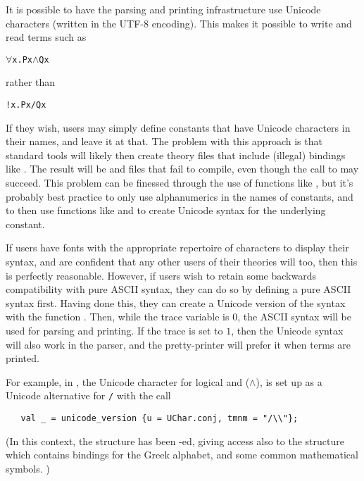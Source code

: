 It is possible to have the \HOL{} parsing and printing infrastructure
use Unicode characters (written in the UTF-8 encoding).  This makes it
possible to write and read terms such as
\begin{alltt}
   \(\forall\)x. P x \(\land\) Q x
\end{alltt}
rather than
\begin{alltt}
   !x. P x /\bs{} Q x
\end{alltt}
If they wish, users may simply define constants that have Unicode
characters in their names, and leave it at that.  The problem with
this approach is that standard tools will likely then create theory
files that include (illegal) \ML{} bindings like .  The result will be  and
 files that fail to compile, even though the call to
 may succeed. This problem can be finessed through
the use of functions like , but it's probably best
practice to only use alphanumerics in the names of constants, and to
then use functions like  and  to create
Unicode syntax for the underlying constant.

If users have fonts with the appropriate repertoire of characters to
display their syntax, and are confident that any other users of their
theories will too, then this is perfectly reasonable.  However, if
users wish to retain some backwards compatibility with pure ASCII
syntax, they can do so by defining a pure ASCII syntax first.  Having
done this, they can create a Unicode version of the syntax with the
function .  Then, while the trace
variable  is $0$, the ASCII syntax will be used for
parsing and printing.  If the trace is set to $1$, then the Unicode
syntax will also work in the parser, and the pretty-printer will
prefer it when terms are printed.

For example, in , the Unicode character for logical
and (\texttt{$\land$}), is set up as a Unicode alternative for
\texttt{/\bs} with the call
\begin{verbatim}
   val _ = unicode_version {u = UChar.conj, tmnm = "/\\"};
\end{verbatim}
(In this context, the  structure has been -ed,
giving access also to the structure  which contains bindings
for the Greek alphabet, and some common mathematical symbols. )

